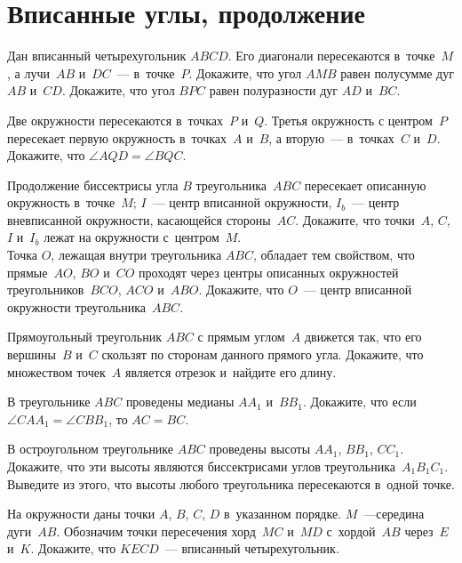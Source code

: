 

\section*{Вписанные углы, продолжение}


\begin{problems}

\item
Дан вписанный четырехугольник $ABCD$.
Его диагонали пересекаются в~точке~$M$, а лучи~$AB$ и~$DC$~--- в~точке~$P$.
Докажите, что угол $AMB$ равен полусумме дуг $AB$ и~$CD$.
Докажите, что угол $BPC$ равен полуразности дуг $AD$ и~$BC$.

\item
Две окружности пересекаются в~точках~$P$ и~$Q$.
Третья окружность с центром~$P$ пересекает первую окружность в~точках~$A$
и~$B$, а вторую~--- в~точках~$C$ и~$D$.
Докажите, что $\angle AQD = \angle BQC$.

\item
\sbp
Продолжение биссектрисы угла $B$ треугольника~$ABC$ пересекает описанную
окружность в~точке~$M$; $I$~--- центр вписанной окружности, $I_b$~--- центр
вневписанной окружности, касающейся стороны~$AC$.
Докажите, что точки~$A$, $C$, $I$ и~$I_b$ лежат на окружности с~центром~$M$.
\\
\sbp
Точка $O$, лежащая внутри треугольника $ABC$, обладает тем свойством, что
прямые~$AO$, $BO$ и~$CO$ проходят через центры описанных окружностей
треугольников~$BCO$, $ACO$ и~$ABO$.
Докажите, что $O$~--- центр вписанной окружности треугольника~$ABC$.

\item
Прямоугольный треугольник $ABC$ с прямым углом~$A$ движется так, что его
вершины~$B$ и~$C$ скользят по сторонам данного прямого угла.
Докажите, что множеством точек~$A$ является отрезок и~найдите его длину.

\item
В треугольнике $ABC$ проведены медианы $A A_1$ и~$B B_1$.
Докажите, что если $\angle C A A_1 = \angle C B B_1$, то $AC = BC$.

\item
В остроугольном треугольнике $ABC$ проведены высоты $A A_1$, $B B_1$, $C C_1$.
Докажите, что эти высоты являются биссектрисами углов
треугольника~$A_1 B_1 C_1$.
Выведите из этого, что высоты любого треугольника пересекаются в~одной точке.

\item
На окружности даны точки $A$, $B$, $C$, $D$ в~указанном порядке.
$M$~---середина дуги~$AB$.
Обозначим точки пересечения хорд~$MC$ и~$MD$ с~хордой~$AB$ через~$E$ и~$K$.
Докажите, что $KECD$~--- вписанный четырехугольник.

\end{problems}

